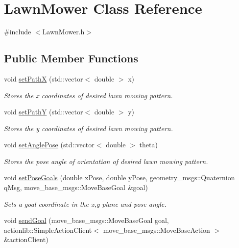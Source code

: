 \hypertarget{classLawnMower}{\section{Lawn\-Mower Class Reference}
\label{classLawnMower}
}


{\ttfamily \#include $<$Lawn\-Mower.\-h$>$}

\subsection*{Public Member Functions}
\begin{DoxyCompactItemize}
\item 
void \hyperlink{classLawnMower_a522dfba30f16929bbb4fa60af11771b3}{set\-Path\-X} (std\-::vector$<$ double $>$ x)
\begin{DoxyCompactList}\small\item\em Stores the x coordinates of desired lawn mowing pattern. \end{DoxyCompactList}\item 
void \hyperlink{classLawnMower_aa623d7ab5e162524a7c3ee9fe4de8fe1}{set\-Path\-Y} (std\-::vector$<$ double $>$ y)
\begin{DoxyCompactList}\small\item\em Stores the y coordinates of desired lawn mowing pattern. \end{DoxyCompactList}\item 
void \hyperlink{classLawnMower_a05dbed29e3ee522d845c8fbb9fe4b986}{set\-Angle\-Pose} (std\-::vector$<$ double $>$ theta)
\begin{DoxyCompactList}\small\item\em Stores the pose angle of orientation of desired lawn mowing pattern. \end{DoxyCompactList}\item 
void \hyperlink{classLawnMower_af4e360e5861ef467a824c54b3027a25c}{set\-Pose\-Goals} (double x\-Pose, double y\-Pose, geometry\-\_\-msgs\-::\-Quaternion q\-Msg, move\-\_\-base\-\_\-msgs\-::\-Move\-Base\-Goal \&goal)
\begin{DoxyCompactList}\small\item\em Sets a goal coordinate in the x,y plane and pose angle. \end{DoxyCompactList}\item 
void \hyperlink{classLawnMower_ac0a9afe85e5ab7067d1b61d95964119b}{send\-Goal} (move\-\_\-base\-\_\-msgs\-::\-Move\-Base\-Goal goal, actionlib\-::\-Simple\-Action\-Client$<$ move\-\_\-base\-\_\-msgs\-::\-Move\-Base\-Action $>$ \&action\-Client)

\end{DoxyCompactItemize}
